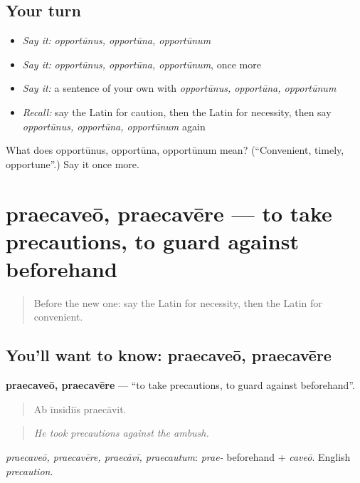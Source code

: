 \subsection*{Your turn}
\begin{itemize}
\raggedright
  \item \emph{Say it:} \emph{opportūnus, opportūna, opportūnum}
  \item \emph{Say it:} \emph{opportūnus, opportūna, opportūnum}, once more
  \item \emph{Say it:} a sentence of your own with \emph{opportūnus, opportūna, opportūnum}
  \item \emph{Recall:} say the Latin for caution, then the Latin for necessity, then say \emph{opportūnus, opportūna, opportūnum} again
\end{itemize}

\begin{tcolorbox}[breakable,colback=teal!4,colframe=teal!35!black,title={Before you move on}]
What does opportūnus, opportūna, opportūnum mean? (\textquotedblleft{}Convenient, timely, opportune\textquotedblright{}.) Say it once more.
\end{tcolorbox}
\section[praecaveō, praecavēre]{praecaveō, praecavēre — to take precautions, to guard against beforehand}

\label{lesson:LA-C392-praecaveo}



\begin{quote}
Before the new one: say the Latin for necessity, then the Latin for convenient.
\end{quote}

\subsection*{You'll want to know: praecaveō, praecavēre}
\textbf{praecaveō, praecavēre} — \textquotedblleft{}to take precautions, to guard against beforehand\textquotedblright{}.

\begin{quote}
Ab īnsidiīs praecāvit.
\end{quote}

\begin{quote}
\emph{He took precautions against the ambush.}
\end{quote}

\emph{praecaveō, praecavēre, praecāvī, praecautum}: \emph{prae-} beforehand + \emph{caveō}. English \emph{precaution}.

